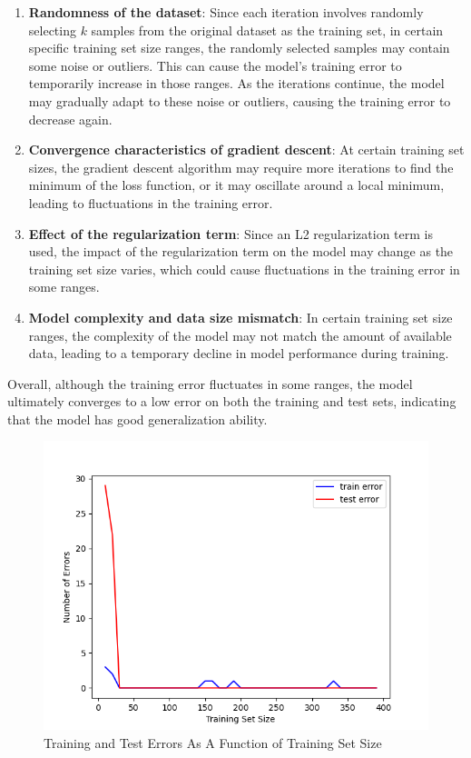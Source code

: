 \documentclass[a4paper, utf8]{ctexart}
\begin{document}
	\begin{enumerate}[itemsep=2pt, topsep=0pt, parsep=0pt]
	    \item \textbf{Randomness of the dataset}: Since each iteration involves randomly selecting $k$ samples from the original dataset as the training set, in certain specific training set size ranges, the randomly selected samples may contain some noise or outliers. This can cause the model's training error to temporarily increase in those ranges. As the iterations continue, the model may gradually adapt to these noise or outliers, causing the training error to decrease again.
	    \item \textbf{Convergence characteristics of gradient descent}: At certain training set sizes, the gradient descent algorithm may require more iterations to find the minimum of the loss function, or it may oscillate around a local minimum, leading to fluctuations in the training error.
	    \item \textbf{Effect of the regularization term}: Since an L2 regularization term is used, the impact of the regularization term on the model may change as the training set size varies, which could cause fluctuations in the training error in some ranges.
	    \item \textbf{Model complexity and data size mismatch}: In certain training set size ranges, the complexity of the model may not match the amount of available data, leading to a temporary decline in model performance during training.
	\end{enumerate}
	
	Overall, although the training error fluctuates in some ranges, the model ultimately converges to a low error on both the training and test sets, indicating that the model has good generalization ability.
	
	\begin{figure}[htbp]
		\centering
		\centering
		\includegraphics[width=.6\linewidth]{./figure/2-2.png}
		\caption{Training and Test Errors As A Function of Training Set Size}
	\end{figure}
	
\end{document}
